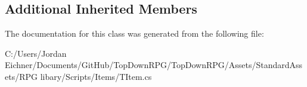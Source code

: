 \subsection*{Additional Inherited Members}


The documentation for this class was generated from the following file\+:\begin{DoxyCompactItemize}
\item 
C\+:/\+Users/\+Jordan Eichner/\+Documents/\+Git\+Hub/\+Top\+Down\+R\+P\+G/\+Top\+Down\+R\+P\+G/\+Assets/\+Standard\+Assets/\+R\+P\+G libary/\+Scripts/\+Items/T\+Item.\+cs\end{DoxyCompactItemize}
